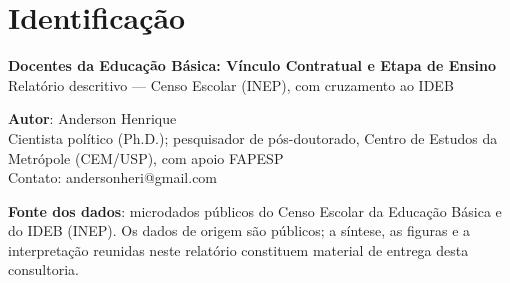 \clearpage
\section*{Identificação}

\textbf{Docentes da Educação Básica: Vínculo Contratual e Etapa de Ensino}\\
Relatório descritivo --- Censo Escolar (INEP), com cruzamento ao IDEB

\textbf{Autor}: Anderson Henrique\\
Cientista político (Ph.D.); pesquisador de pós-doutorado, Centro de Estudos da Metrópole (CEM/USP), com apoio FAPESP\\
Contato: andersonheri@gmail.com

\textbf{Fonte dos dados}: microdados públicos do Censo Escolar da Educação Básica e do IDEB (INEP). Os dados de origem são públicos; a síntese, as figuras e a interpretação reunidas neste relatório constituem material de entrega desta consultoria.

\clearpage
